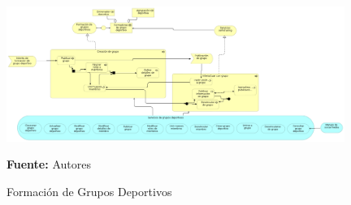 \begin{figure}[!htb]
  \begin{center}
    \includegraphics[width=11cm]{./imagenes/business_process/formaciongruposdeportivos.png}
    \caption{Formación de Grupos Deportivos}
    \label{fig:bp_formacion_grupos_deportivos}
    \textbf{Fuente:}  Autores
  \end{center}
\end{figure}

